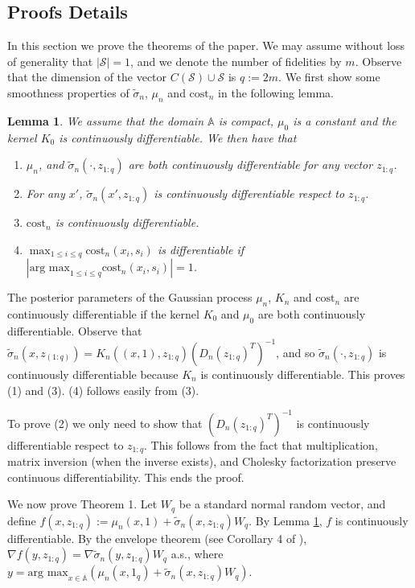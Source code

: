 \documentclass[letterpaper]{article}
\newtheorem{lemma}{Lemma}
\numberwithin{equation}{section}
\begin{document}
\subsection{Proofs Details}

In this section we prove the theorems of the paper. We may assume without loss of generality that $|\mathcal{S}| = 1$, and we denote the number of fidelities by $m$. Observe that the dimension of the vector  $C(\mathcal{S}) \cup \mathcal{S}$ is $q:=2m$.
We first show some smoothness properties of $\tilde{\sigma}_{n}$, $\mu_{n}$ and  $\mbox{cost}_{n}$ in the following lemma.
\begin{lemma}
\label{smooth_lemma}
We assume that the domain  $\mathbb{A}$ is compact, $\mu_0$ is a constant and the kernel $K_{0}$ is continuously differentiable. We then have that
\begin{enumerate}
\item $\mu_{n}$, and $\tilde{\sigma}_{n}\left(\cdot,z_{1:q}\right)$ are both continuously differentiable for any vector $z_{1:q}$.
\item For any $x'$, $\tilde{\sigma}_{n}\left(x',z_{1:q}\right)$ is continuously  differentiable respect to $z_{1:q}$.
\item $\mbox{cost}_{n}$ is continuously differentiable.
\item $\max_{1 \le i \le q}\text{cost}_{n}(x_i, s_i)$ is differentiable if $\left|\mbox{arg max}_{1\leq i\leq q}\mbox{cost}_{n}\left(x_{i},s_{i}\right)\right|=1$.
\end{enumerate}
\end{lemma}
\proof{}
The posterior parameters of the Gaussian process $\mu_{n}$, $K_{n}$ and $\mbox{cost}_{n}$ are continuously differentiable if the kernel $K_{0}$ and $\mu_{0}$ are both continuously differentiable. Observe that $\tilde{\sigma}_n(x, z_{(1:q)})= K_{n}\left((x, 1), z_{1:q}\right) (D_{n}\left(z_{1:q}\right)^T)^{-1}$, and so $\tilde{\sigma}_{n}\left(\cdot,z_{1:q}\right)$ is continuously differentiable because $K_{n}$ is continuously differentiable. This proves (1) and (3). (4) follows easily from (3).

To prove (2) we only need to show that $(D_{n}\left(z_{1:q}\right)^T)^{-1}$ is continuously differentiable respect to $z_{1:q}$. This follows from the fact that multiplication, matrix inversion (when the inverse exists), and Cholesky factorization \citep{smith1995differentiation} preserve continuous differentiability. This ends the proof.
\endproof


We now prove Theorem 1.
\proof{}
Let $W_q$ be a standard normal random vector, and define $f(x,z_{1:q}):=\mu_n \left(x, 1\right)+\tilde{\sigma}_n\left(x, z_{1:q}\right)W_q$. By Lemma \ref{smooth_lemma}, $f$ is continuously differentiable. By the envelope theorem (see Corollary 4 of \citealt{milgrom2002envelope}), $\nabla f(y,z_{1:q})=\nabla \tilde{\sigma}_n\left(y, z_{1:q}\right)W_q$ a.s., where $y=\mbox{arg max}_{x\in \mathbb{A}}\left(\mu_n(x, 1_q)+\tilde{\sigma}_n\left(x, z_{1:q}\right)W_{q}\right)$.
\end{document}
